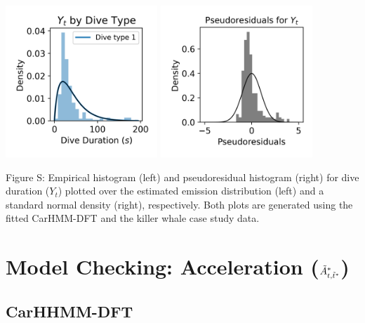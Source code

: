 \documentclass{article}
\begin{document}
        \begin{center}
        \includegraphics[width=2.25in]{../Plots/2019/20190902-182840-CATs_OB_1_0_267_CarHMM_empirical_hist_dive_duration.png}
        \includegraphics[width=2.25in]{../Plots/2019/20190902-182840-CATs_OB_1_0_267_CarHMM_pseudresids_Dive_Duration.png}
        \end{center}
        
        \noindent Figure S: Empirical histogram (left) and pseudoresidual histogram (right) for dive duration ($Y_{t}$) plotted over the estimated emission distribution (left) and a standard normal density (right), respectively. Both plots are generated using the fitted CarHMM-DFT and the killer whale case study data.
        \addtocounter{fignum}{1}
        
    \newpage
    \section{Model Checking: Acceleration ($\tilde{A}^*_{t,\tilde t^*}$)}
        
        \subsection{CarHHMM-DFT}
        
\end{document}
